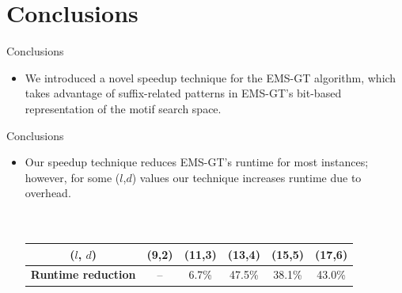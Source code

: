 \documentclass[pdf,xcolor={dvipsnames}]{beamer}
\begin{document}
\section{Conclusions}
	\begin{frame}{Conclusions}
		\ \\
		\begin{itemize}
		\item We introduced a novel speedup technique for the EMS-GT algorithm, which takes advantage of suffix-related patterns in EMS-GT's bit-based representation of the motif search space. 

		\end{itemize}
	\end{frame}

	\begin{frame}{Conclusions}
		\ \\
		\begin{itemize}
		\item Our speedup technique {reduces EMS-GT's runtime for most instances}; however, for some ($l$,$d$) values our technique increases runtime due to overhead.\\\ \\\ \\
		\begin{table}
			\footnotesize
			\renewcommand{\arraystretch}{1.3}
			\label{tbl:runtimes_v_pms}
			\centering
			\begin{tabular}{|c|c|c|c|c|c|}
			\hline \bfseries ($l$, $d$) & \bfseries (9,2) & \bfseries (11,3) & \bfseries (13,4) & \bfseries (15,5) & \bfseries (17,6)\\
			\hline \bfseries Runtime reduction & -- &  6.7\% & 47.5\% & 38.1\% & 43.0\%\\
			\hline
			\end{tabular}
		\end{table}

		\end{itemize}
	\end{frame}
\end{document}
